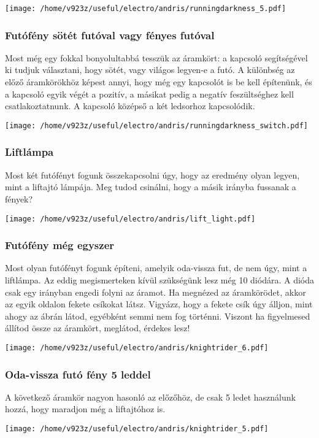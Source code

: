 \documentclass[16pt]{scrreprt}
\begin{document}
\texttt{[image: /home/v923z/useful/electro/andris/runningdarkness\_5.pdf]}

\subsubsection{Futófény sötét futóval vagy fényes futóval}
Most még egy fokkal bonyolultabbá tesszük az áramkört: a kapcsoló segítségével ki tudjuk választani, hogy sötét, vagy
világos legyen-e a futó. A különbség az előző áramkörökhöz képest annyi, hogy még egy kapcsolót is be kell építenünk,
és a kapcsoló egyik végét a pozitív, a másikat pedig a negatív feszültséghez kell csatlakoztatnunk. A kapcsoló középső
a két ledsorhoz kapcsolódik. 

\texttt{[image: /home/v923z/useful/electro/andris/runningdarkness\_switch.pdf]}

\subsubsection{Liftlámpa}
Most két futófényt fogunk összekapcsolni úgy, hogy az eredmény olyan legyen, mint a liftajtó lámpája. Meg tudod
csinálni, hogy a másik irányba fussanak a fények?

\texttt{[image: /home/v923z/useful/electro/andris/lift\_light.pdf]}

\subsubsection{Futófény még egyszer}
Most olyan futófényt fogunk építeni, amelyik oda-vissza fut, de nem úgy, mint a liftlámpa. Az eddig megismerteken kívül
szükségünk lesz még 10 diódára. A dióda csak egy irányban engedi folyni az áramot. Ha megnézed az áramkörödet, akkor az
egyik oldalon fekete csíkokat látsz. Vigyázz, hogy a fekete csík úgy álljon, mint ahogy az ábrán látod, egyébként semmi
nem fog történni. Viszont ha figyelmesed állítod össze az áramkört, meglátod, érdekes lesz!

\texttt{[image: /home/v923z/useful/electro/andris/knightrider\_6.pdf]}

\subsubsection{Oda-vissza futó fény 5 leddel}

A következő áramkör nagyon hasonló az előzőhöz, de csak 5 ledet használunk hozzá, hogy maradjon még a liftajtóhoz is.

\texttt{[image: /home/v923z/useful/electro/andris/knightrider\_5.pdf]}
\end{document}
